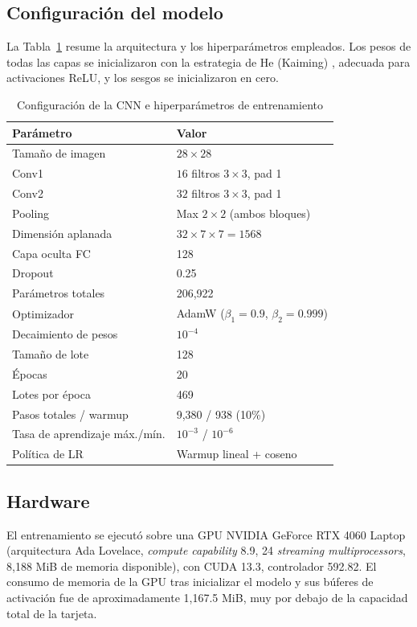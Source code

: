 \documentclass[conference]{IEEEtran}
\begin{document}
\subsection{Configuración del modelo}
La Tabla~\ref{tab:hyperparams} resume la arquitectura y los hiperparámetros empleados. Los pesos de todas las capas se inicializaron con la estrategia de He (Kaiming) \cite{he2015delving}, adecuada para activaciones ReLU, y los sesgos se inicializaron en cero.

\begin{table}[h]
\centering
\caption{Configuración de la CNN e hiperparámetros de entrenamiento}
\label{tab:hyperparams}
\begin{tabular}{ll}
\toprule
\textbf{Parámetro} & \textbf{Valor} \\
\midrule
Tamaño de imagen & $28\times28$ \\
Conv1 & $16$ filtros $3\times3$, pad 1 \\
Conv2 & $32$ filtros $3\times3$, pad 1 \\
Pooling & Max $2\times2$ (ambos bloques) \\
Dimensión aplanada & $32\times7\times7=1568$ \\
Capa oculta FC & 128 \\
Dropout & 0.25 \\
Parámetros totales & 206{,}922 \\
\midrule
Optimizador & AdamW ($\beta_1=0.9$, $\beta_2=0.999$) \\
Decaimiento de pesos & $10^{-4}$ \\
Tamaño de lote & 128 \\
Épocas & 20 \\
Lotes por época & 469 \\
Pasos totales / warmup & 9{,}380 / 938 (10\%) \\
Tasa de aprendizaje máx./mín. & $10^{-3}$ / $10^{-6}$ \\
Política de LR & Warmup lineal + coseno \\
\bottomrule
\end{tabular}
\end{table}

\subsection{Hardware}
El entrenamiento se ejecutó sobre una GPU NVIDIA GeForce RTX 4060 Laptop (arquitectura Ada Lovelace, \emph{compute capability} 8.9, 24 \emph{streaming multiprocessors}, 8{,}188 MiB de memoria disponible), con CUDA 13.3, controlador 592.82. El consumo de memoria de la GPU tras inicializar el modelo y sus búferes de activación fue de aproximadamente 1{,}167.5 MiB, muy por debajo de la capacidad total de la tarjeta.
\end{document}
